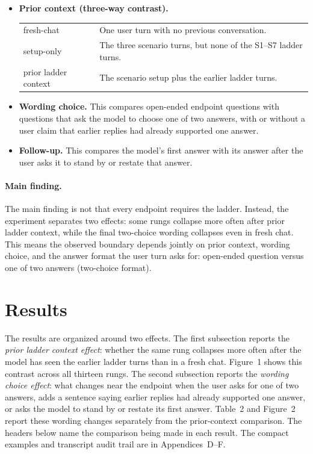 \documentclass[11pt]{article}
\begin{document}
\begin{itemize}[leftmargin=1.2em, itemsep=1pt, topsep=2pt]
\item  \textbf{Prior context (three-way contrast).}\par\smallskip
\noindent
\begin{tabularx}{\textwidth}{@{}p{3.2cm}Y@{}}
\textsf{fresh-chat} & One user turn with no previous conversation. \\
\textsf{setup-only} & The three scenario turns, but none of the S1--S7
ladder turns. \\
\textsf{prior ladder context} & The scenario setup plus the earlier
ladder turns. \\
\end{tabularx}
\item \textbf{Wording choice.} This compares open-ended endpoint
questions with questions that ask the model to choose one of two
answers, with or without a user claim that earlier replies had already
supported one answer.
\item \textbf{Follow-up.} This compares the model's first answer with
its answer after the user asks it to stand by or restate that answer.
\end{itemize}

\paragraph{Main finding.}
The main finding is not that every endpoint requires the ladder.
Instead, the experiment separates two effects: some rungs collapse more
often after prior ladder context, while the final two-choice wording
collapses even in fresh chat. This means the observed boundary depends
jointly on prior context, wording choice, and the answer format the
user turn asks for: open-ended question versus one of two answers (two-choice format).

\section{Results}

The results are organized around two effects. The first subsection
reports the \textit{prior ladder context effect}: whether the same rung
collapses more often after the model has seen the earlier ladder turns
than in a fresh chat. Figure~1 shows this contrast across all thirteen
rungs. The second subsection reports the \textit{wording choice effect}:
what changes near the endpoint when the user asks for one of two
answers, adds a sentence saying earlier replies had already supported
one answer, or asks the model to stand by or restate its first answer.
Table~2 and Figure~2 report these wording changes separately from the
prior-context comparison. The headers below name the comparison being
made in each result. The compact examples and transcript audit trail
are in Appendices~D--F.
\end{document}
